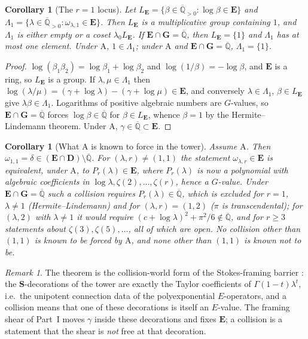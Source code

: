 \documentclass[11pt,a4paper]{article}
\newcommand{\Qbar}{\overline{\mathbb Q}}
\newcommand{\EE}{\mathbf E}
\newcommand{\GG}{\mathbf G}
\newcommand{\DD}{\mathbf D}
\newcommand{\Sring}{\mathbf S}
\newtheorem{corollary}[theorem]{Corollary}
\theoremstyle{definition}
\theoremstyle{remark}
\newtheorem{remark}[theorem]{Remark}
\numberwithin{equation}{section}
\begin{document}
\begin{corollary}[The $r=1$ locus]\label{II:cor:locus}
Let $L_\EE=\{\beta\in\Qbar_{>0}:\log\beta\in\EE\}$ and
$\Lambda_1=\{\lambda\in\Qbar_{>0}:\omega_{\lambda,1}\in\EE\}$. Then $L_\EE$ is a
multiplicative group containing $1$, and $\Lambda_1$ is either empty or a coset
$\lambda_0L_\EE$. If $\EE\cap\GG=\Qbar$, then $L_\EE=\{1\}$ and $\Lambda_1$ has at most one
element. Under $\mathrm A$, $1\in\Lambda_1$; under $\mathrm A$ and $\EE\cap\GG=\Qbar$,
$\Lambda_1=\{1\}$.
\end{corollary}
\begin{proof}
$\log(\beta_1\beta_2)=\log\beta_1+\log\beta_2$ and $\log(1/\beta)=-\log\beta$, and $\EE$ is a
ring, so $L_\EE$ is a group. If $\lambda,\mu\in\Lambda_1$ then
$\log(\lambda/\mu)=(\gamma+\log\lambda)-(\gamma+\log\mu)\in\EE$, and conversely
$\lambda\in\Lambda_1$, $\beta\in L_\EE$ give $\lambda\beta\in\Lambda_1$. Logarithms of
positive algebraic numbers are $G$-values, so $\EE\cap\GG=\Qbar$ forces
$\log\beta\in\Qbar$ for $\beta\in L_\EE$, whence $\beta=1$ by the Hermite--Lindemann
theorem. Under $\mathrm A$, $\gamma\in\Qbar\subset\EE$.
\end{proof}

\begin{corollary}[What $\mathrm A$ is known to force in the tower]\label{II:cor:forced}
Assume $\mathrm A$. Then $\omega_{1,1}=\delta\in(\EE\cap\DD)\setminus\Qbar$. For
$(\lambda,r)\ne(1,1)$ the statement $\omega_{\lambda,r}\in\EE$ is equivalent, under
$\mathrm A$, to $P_r(\lambda)\in\EE$, where $P_r(\lambda)$ is now a polynomial with algebraic
coefficients in $\log\lambda,\zeta(2),\dots,\zeta(r)$, hence a $G$-value. Under
$\EE\cap\GG=\Qbar$ such a collision requires $P_r(\lambda)\in\Qbar$, which is excluded for
$r=1$, $\lambda\ne1$ (Hermite--Lindemann) and for $(\lambda,r)=(1,2)$ ($\pi$ is
transcendental); for $(\lambda,2)$ with $\lambda\ne1$ it would require
$(c+\log\lambda)^2+\pi^2/6\notin\Qbar$, and for $r\ge3$ statements about
$\zeta(3),\zeta(5),\dots$, all of which are open. No collision other than $(1,1)$ is known to
be forced by $\mathrm A$, and none other than $(1,1)$ is known not to be.
\end{corollary}

\begin{remark}
The theorem is the collision-world form of the Stokes-framing barrier
\cite[\S``The Stokes-framing barrier'']{K002}: the $\Sring$-decorations of the tower are exactly
the Taylor coefficients of $\Gamma(1-t)\lambda^t$, i.e.\ the unipotent connection data of the
polyexponential $E$-operators, and a collision means that one of these decorations is
itself an $E$-value. The framing shear of Part~I moves $\gamma$ inside these decorations
and fixes $\EE$; a collision is a statement that the shear is \emph{not} free at that
decoration.
\end{remark}
\end{document}
